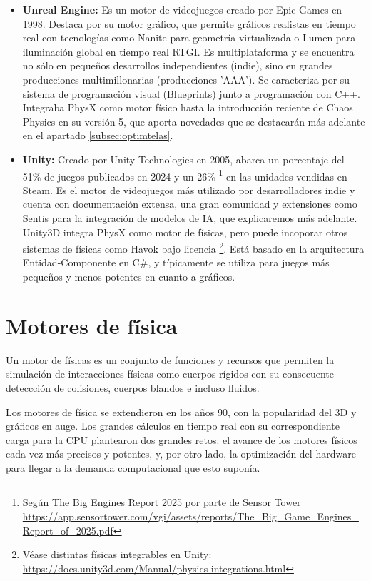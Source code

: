 \begin{itemize}
\item \textbf{Unreal Engine:}
Es un motor de videojuegos creado por Epic Games en 1998.  Destaca por su motor gráfico, que permite gráficos realistas en tiempo real con tecnologías como Nanite para geometría virtualizada o Lumen para iluminación global en tiempo real RTGI. Es multiplataforma y se encuentra no sólo en pequeños desarrollos independientes (indie), sino en grandes producciones multimillonarias (producciones 'AAA'). Se caracteriza por su sistema de programación visual (Blueprints) junto a programación con C++. Integraba PhysX como motor físico hasta la introducción reciente de Chaos Physics en su versión 5, que aporta novedades que se destacarán más adelante en el apartado \ref{subsec:optimtelas}.

\item \textbf{Unity:}
Creado por Unity Technologies en 2005, abarca un porcentaje del 51\% de juegos publicados en 2024 y un 26\% \footnote{Según The Big Engines Report 2025 por parte de Sensor Tower \url{https://app.sensortower.com/vgi/assets/reports/The_Big_Game_Engines_Report_of_2025.pdf}} en las unidades vendidas en Steam. Es el motor de videojuegos más utilizado por desarrolladores indie y cuenta con documentación extensa, una gran comunidad y extensiones como Sentis para la integración de modelos de IA, que explicaremos más adelante. Unity3D integra PhysX como motor de físicas, pero puede incoporar otros sistemas de físicas como Havok bajo licencia \footnote{Véase distintas físicas integrables en Unity: \url{https://docs.unity3d.com/Manual/physics-integrations.html}}. Está basado en la arquitectura Entidad-Componente en C\#, y típicamente se utiliza para juegos más pequeños y menos potentes en cuanto a gráficos.
\end{itemize}

\section{Motores de física}
\label{sec:motfisicas}

Un motor de físicas es un conjunto de funciones y recursos que permiten la simulación de interacciones físicas como cuerpos rígidos con su consecuente deteccción de colisiones, cuerpos blandos e incluso fluidos.
\newline

Los motores de física se extendieron en los años 90, con la popularidad del 3D y gráficos en auge. Los grandes cálculos en tiempo real con su correspondiente carga para la CPU plantearon dos grandes retos: el avance de los motores físicos cada vez más precisos y potentes, y, por otro lado, la optimización del hardware para llegar a la demanda computacional que esto suponía. \newline

